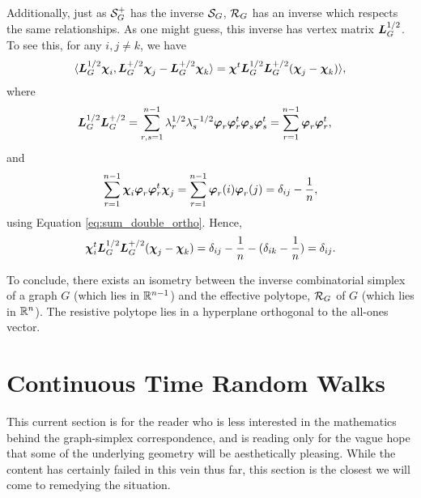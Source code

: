 Additionally, just as $\mathcal{S}_G^+$  has  the inverse $\mathcal{S}_G$, $\mathcal{R}_G$  has an inverse which respects the same  relationships. As one might guess, this inverse has vertex matrix $\vb*{L}_G^{1/2}$. To see this, for any $i,j\neq k$,  we have 
\begin{equation*}
\langle \vb*{L}_G^{1/2}\boldsymbol{\chi}_i,\vb*{L}_G^{+/2}\boldsymbol{\chi}_j-\vb*{L}_G^{+/2}\boldsymbol{\chi}_k\rangle = \boldsymbol{\chi}^t \vb*{L}_G^{1/2}\vb*{L}_G^{+/2}(\boldsymbol{\chi}_j-\boldsymbol{\chi}_k)\rangle,
\end{equation*}
where 
\begin{align*}
\vb*{L}_G^{1/2}\vb*{L}_G^{+/2} &= \sum_{r,s=1}^{n-1}\lambda_r^{1/2}\lambda_s^{-1/2}\vb*{\varphi}_r\vb*{\varphi}_r^t\vb*{\varphi}_s\vb*{\varphi}_s^t = \sum_{r=1}^{n-1} \vb*{\varphi}_r\vb*{\varphi}_r^t,
\end{align*}
and 
\begin{align*}
\sum_{r=1}^{n-1}\boldsymbol{\chi}_i \vb*{\varphi}_r\vb*{\varphi}_r^t\boldsymbol{\chi}_j = \sum_{r=1}^{n-1}\vb*{\varphi}_r(i)\vb*{\varphi}_r(j) = \delta_{ij} - \frac{1}{n},
\end{align*}
using Equation \eqref{eq:sum_double_ortho}. Hence, 
\begin{align*}
\boldsymbol{\chi}_i^t \vb*{L}_G^{1/2}\vb*{L}_G^{+/2}(\boldsymbol{\chi}_j-\boldsymbol{\chi}_k) = \delta_{ij} - \frac{1}{n} - (\delta_{ik}-\frac{1}{n}) = \delta_{ij}.
\end{align*}

To  conclude, there exists an isometry between the inverse combinatorial  simplex of a graph $G$ (which  lies in $\mathbb{R}^{n-1}$) and the effective  polytope, $\mathcal{R}_G$ of  $G$ (which  lies in $\mathbb{R}^n$). The resistive polytope lies in a hyperplane orthogonal to the  all-ones vector.  






\section{Continuous Time Random Walks}
\label{sec:random_walks}
This current section is for the reader who is less interested  in the  mathematics  behind the graph-simplex correspondence, and is reading only for the vague  hope  that some of the underlying geometry will be aesthetically pleasing. While  the  content has certainly failed in this vein thus far, this section  is the closest we will come to remedying the situation. 

